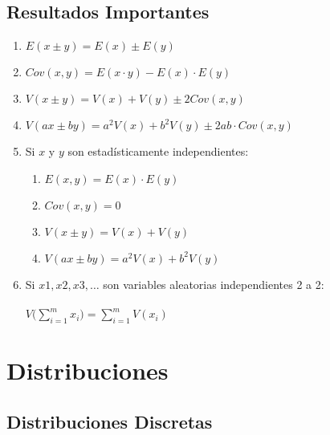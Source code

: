 \documentclass[10pt,letterpaper]{article}
\begin{document}
\subsection{Resultados Importantes}
\begin{enumerate}
\item $E(x\pm y)=E(x)\pm E(y)$
\item $Cov(x,y)=E(x\cdot y)-E(x)\cdot E(y)$
\item $V(x\pm y)=V(x)+V(y)\pm 2Cov(x,y)$
\item $V(ax\pm by)=a^2V(x)+b^2V(y) \pm 2ab\cdot Cov(x,y)$
\item Si $x$ y $y$ son estadísticamente independientes:
\begin{enumerate}
\item $E(x,y)=E(x)\cdot E(y)$
\item $Cov(x,y)=0$
\item $V(x\pm y)=V(x)+V(y)$
\item $V(ax\pm by)=a^2V(x)+b^2V(y)$
\end{enumerate}
\item Si $x1,x2,x3,\ldots$ son variables aleatorias independientes 2 a 2:\\ \vspace{0.025cm} \\
$V\Bigg( \displaystyle\sum_{i=1}^{m} x_i \Bigg) = \displaystyle\sum_{i=1}^{m} V(x_i)$
\end{enumerate}

\section{Distribuciones}
\subsection{Distribuciones Discretas}
\end{document}
